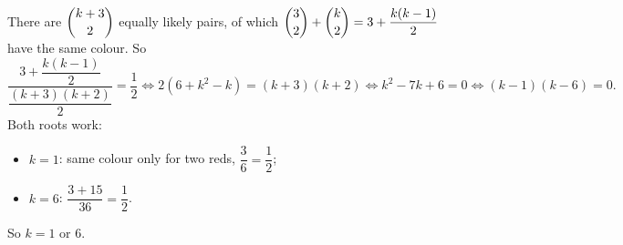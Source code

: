 There are $\dbinom{k+3}{2}$ equally likely pairs, of which $\dbinom32+\dbinom k2=3+\dfrac{k(k-1)}{2}$ have the same colour. So
\[\dfrac{3+\dfrac{k(k-1)}{2}}{\dfrac{(k+3)(k+2)}{2}}=\dfrac{1}{2}\iff 2\left(6+k^2-k\right)=(k+3)(k+2)\iff k^2-7k+6=0\iff(k-1)(k-6)=0.\]
Both roots work:
\begin{itemize}
\item $k=1$: same colour only for two reds, $\dfrac{3}{6}=\dfrac{1}{2}$;
\item $k=6$: $\dfrac{3+15}{36}=\dfrac{1}{2}$.
\end{itemize}
So $k=\boxed{1\text{ or }6}$.
